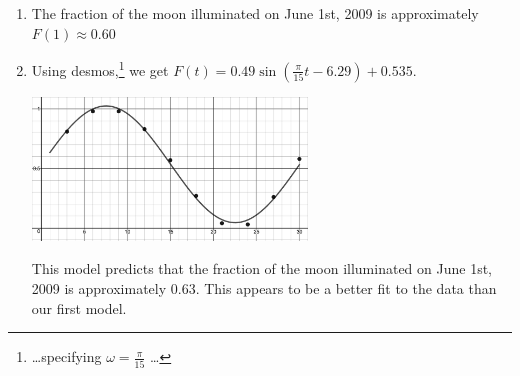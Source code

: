 \begin{enumerate}
\begin{enumerate}
\begin{center}
\end{center}


\item  The fraction of the moon illuminated on June 1st, 2009 is approximately $F(1) \approx 0.60$


\item  Using desmos,\footnote{\ldots specifying $\omega = \frac{\pi}{15}$ \ldots} we get $F(t) = 0.49\sin \left(\frac{\pi }{15}t-6.29\right)+0.535$.

\begin{center}

 \includegraphics[height=1.5in]{./GraphsofSineandCosineGraphics/MoonIlluminatonDesmos.jpg} 

\end{center}

This model predicts that the fraction of the moon illuminated on June 1st, 2009 is approximately $0.63$.  This appears to be a better fit to the data than our first model.

\end{enumerate}


\end{enumerate}




